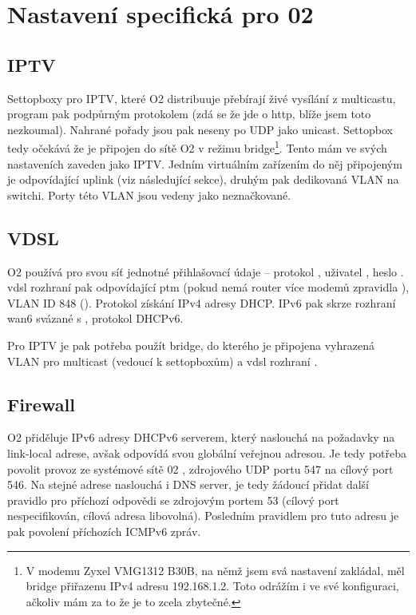 \section{Nastavení specifická pro 02}
\subsection{IPTV}
Settopboxy pro IPTV, které O2 distribuuje přebírají živé vysílání z multicastu,
program pak podpůrným protokolem (zdá se že jde o http, blíže jsem toto nezkoumal).
Nahrané pořady jsou pak neseny po UDP jako unicast. Settopbox tedy očekává
že je připojen do sítě O2 v režimu bridge\footnote{V modemu Zyxel VMG1312 B30B,
na němž jsem svá nastavení zakládal, měl bridge přiřazenu IPv4 adresu 192.168.1.2.
Toto odrážím i ve své konfiguraci, ačkoliv mám za to že je to zcela zbytečné.}.
Tento mám ve svých nastaveních
zaveden jako IPTV. Jedním virtuálním zařízením do něj připojeným je
odpovídající uplink (viz následující sekce), druhým pak dedikovaná VLAN
na switchi. Porty této VLAN jsou vedeny jako neznačkované.

\subsection{VDSL}
O2 používá pro svou síť jednotné přihlašovací údaje -- protokol ,
uživatel , heslo . \gls{vdsl} rozhraní pak odpovídající ptm
(pokud nemá router více modemů zpravidla ), VLAN ID 848 ().
Protokol získání IPv4 adresy DHCP. IPv6 pak skrze rozhraní wan6 svázané s ,
protokol DHCPv6.

Pro IPTV je pak potřeba použít bridge, do kterého je připojena vyhrazená VLAN
pro multicast (vedoucí k settopboxům) a vdsl rozhraní .

\subsection{Firewall}
O2 přiděluje IPv6 adresy DHCPv6 serverem, který naslouchá na požadavky na
link-local adrese, avšak odpovídá svou globální veřejnou adresou. Je tedy potřeba
povolit provoz ze systémové sítě 02 , zdrojového
UDP portu 547 na cílový port 546. Na stejné adrese naslouchá i DNS server,
je tedy žádoucí přidat další pravidlo pro příchozí odpovědi se zdrojovým
portem 53 (cílový port nespecifikován, cílová adresa libovolná). Posledním
pravidlem pro tuto adresu je pak povolení příchozích ICMPv6 zpráv.

